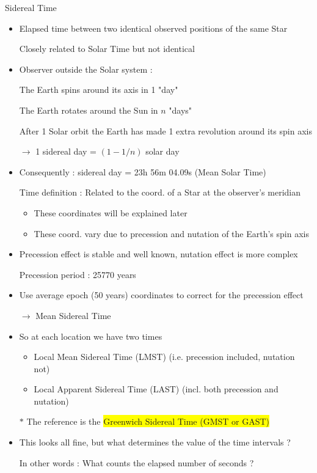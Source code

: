 \Tr
\begin{center}
{\red Sidereal Time}
\end{center}
%
\begin{itemize}
\item {\blue Elapsed time between two identical observed positions of the same Star}
\item[] Closely related to Solar Time but not identical
\item Observer outside the Solar system :
\item[] The Earth spins around its axis in 1 "day"
\item[] The Earth rotates around the Sun in $n$ "days"
\item[] After 1 Solar orbit the Earth has made 1 extra revolution around its spin axis
\item[] $\rightarrow$ 1 sidereal day = $(1-1/n)$ solar day
\item Consequently : { sidereal day = 23h 56m 04.09s (Mean Solar Time)}
\item[] Time definition : Related to the coord. of a Star at the observer's meridian
\begin{itemize}
\item These coordinates will be explained later
\item These coord. vary due to precession and nutation of the Earth's spin axis
\end{itemize}
\end{itemize}

\Tr
\begin{itemize}
\item Precession effect is stable and well known, nutation effect is more complex
\item[] Precession period : 25770 years
\item Use average epoch (50 years) coordinates to correct for the precession effect
\item[] $\rightarrow$ {\blue Mean Sidereal Time}
\item So at each location we have two times
\begin{itemize}
\item {\blue Local Mean Sidereal Time (LMST)} (i.e. precession included, nutation not)
\item {\blue Local Apparent Sidereal Time (LAST)} (incl. both precession and nutation)
\end{itemize}
\item[$\ast$] The reference is the \colorbox{yellow}{Greenwich Sidereal Time (GMST or GAST)} 
\item This looks all fine, but what determines the value of the time intervals ?
\item[] In other words : {\blue What counts the elapsed number of seconds ?}
\end{itemize}

